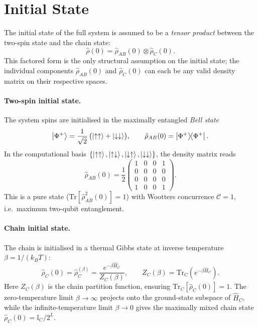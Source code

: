 \documentclass[12pt,a4paper]{article}
\newcommand{\Ham}{\hat{H}}
\newcommand{\rhohat}{\hat{\rho}}
\newcommand{\uparr}{\uparrow}
\newcommand{\downarr}{\downarrow}
\renewcommand{\Tr}{\mathrm{Tr}}
\begin{document}
\section{Initial State}
\label{sec:initial}

The initial state of the full system is assumed to be a \emph{tensor product}
between the two-spin state and the chain state:
\begin{equation}
  \rhohat(0) = \rhohat_{AB}(0)\otimes\rhohat_C(0).
  \label{eq:rho0}
\end{equation}
This factored form is the only structural assumption on the initial state; the
individual components $\rhohat_{AB}(0)$ and $\rhohat_C(0)$ can each be any
valid density matrix on their respective spaces.

\paragraph{Two-spin initial state.}
The system spins are initialised in the maximally entangled \emph{Bell state}
\begin{equation}
  \ket{\Phi^+} = \frac{1}{\sqrt{2}}\,\bigl(\ket{\uparr\uparr} + \ket{\downarr\downarr}\bigr),
  \qquad
  \rhohat_{AB}(0) = \ketbra{\Phi^+}{\Phi^+}.
  \label{eq:bell}
\end{equation}
In the computational basis $\{\ket{\uparr\uparr},\ket{\uparr\downarr},
\ket{\downarr\uparr},\ket{\downarr\downarr}\}$, the density matrix reads
\begin{equation}
  \rhohat_{AB}(0) = \frac{1}{2}\begin{pmatrix}1&0&0&1\\0&0&0&0\\0&0&0&0\\1&0&0&1\end{pmatrix}.
  \label{eq:rhoAB0}
\end{equation}
This is a pure state ($\Tr[\rhohat_{AB}^2(0)]=1$) with Wootters concurrence
$\mathcal{C}=1$, i.e.\ maximum two-qubit entanglement.


\paragraph{Chain initial state.}
The chain is initialised in a thermal Gibbs state at inverse temperature
$\beta=1/(k_B T)$:
\begin{equation}
  \rhohat_C(0) = \rhohat_C^{(\beta)}
  = \frac{e^{-\beta \Ham_C}}{Z_C(\beta)},
  \qquad
  Z_C(\beta) = \Tr_C\!\left(e^{-\beta \Ham_C}\right).
  \label{eq:rhoC0}
\end{equation}
Here $Z_C(\beta)$ is the chain partition function, ensuring
$\Tr_C[\rhohat_C(0)]=1$.  The zero-temperature limit $\beta\to\infty$ projects
onto the ground-state subspace of $\Ham_C$, while the infinite-temperature limit
$\beta\to0$ gives the maximally mixed chain state $\rhohat_C(0)=\mathbb{I}_C/2^L$.
\end{document}
